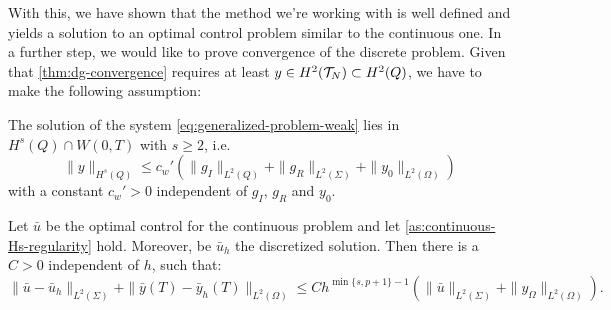 \documentclass[../thesis.tex]{subfiles}
\begin{document}
With this, we have shown that the method we're working with is well defined and yields a solution to an optimal control problem similar to the continuous one. In a further step, we would like to prove convergence of the discrete problem.
Given that \cref{thm:dg-convergence} requires at least $y \in H^2(\mathcal{T}_N) \subset H^2(Q)$, we have to make the following assumption:
\begin{assumption}
\label{as:continuous-Hs-regularity}
The solution of the system \cref{eq:generalized-problem-weak} lies in $H^s(Q) \cap W(0,T)$ with $s \geq 2$, i.e.
\[
	\| y \|_{H^s(Q)} \leq c_w' \left( \| g_I \|_{L^2(Q)} + \| g_R \|_{L^2(\Sigma)} + \| y_0 \|_{L^2(\Omega)} \right)
\]
with a constant $c_w' > 0$ independent of $g_I$, $g_R$ and $y_0$.
\end{assumption}
\begin{theorem}
Let $\bar{u}$ be the optimal control for the continuous problem and let \cref{as:continuous-Hs-regularity} hold. Moreover, be $\bar{u}_h$ the discretized solution.
Then there is a $C > 0$ independent of $h$, such that:
\[
	\| \bar{u} - \bar{u}_h \|_{L^2(\Sigma)} + \| \bar{y}(T) - \bar{y}_h(T) \|_{L^2(\Omega)} \leq C h^{\min \{ s, p+1\} - 1} \left( \| \bar{u} \|_{L^2(\Sigma)} + \| y_\Omega \|_{L^2(\Omega)} \right).
\]
\end{theorem}
\end{document}
